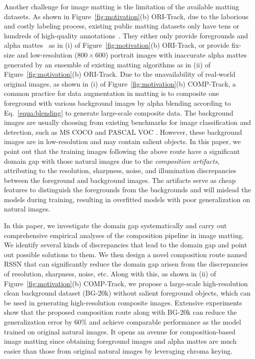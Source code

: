 \documentclass[twocolumn]{svjour3}
\begin{document}
Another challenge for image matting is the limitation of the available matting datasets. As shown in Figure~\ref{fig:motivation}(b) ORI-Track, due to the laborious and costly labeling process, existing public matting datasets only have tens or hundreds of high-quality annotations~\citep{rhemann2009perceptually,shen2016deep,xu2017deep,zhang2019late,Qiao_2020_CVPR}. They either only provide foregrounds and alpha mattes~\citep{xu2017deep,Qiao_2020_CVPR} as in (i) of Figure~\ref{fig:motivation}(b) ORI-Track, or provide fix-size and low-resolution ($800\times600$) portrait images with inaccurate alpha mattes~\citep{shen2016deep} generated by an ensemble of existing matting algorithms as in (ii) of Figure~\ref{fig:motivation}(b) ORI-Track. Due to the unavailability of real-world original images, as shown in (i) of Figure~\ref{fig:motivation}(b) COMP-Track, a common practice for data augmentation in matting is to composite one foreground with various background images by alpha blending according to Eq.~\eqref{equa:blending} to generate large-scale composite data. The background images are usually choosing from existing benchmarks for image classification and detection, such as MS COCO \citep{lin2014microsoft} and PASCAL VOC \citep{everingham2010pascal}. However, these background images are in low-resolution and may contain salient objects. In this paper, we point out that the training images following the above route have a significant domain gap with those natural images due to the \emph{composition artifacts}, attributing to the resolution, sharpness, noise, and illumination discrepancies between the foreground and background images. The artifacts serve as cheap features to distinguish the foregrounds from the backgrounds and will mislead the models during training, resulting in overfitted models with poor generalization on natural images.


In this paper, we investigate the domain gap systematically and carry out comprehensive empirical analyses of the composition pipeline in image matting. We identify several kinds of discrepancies that lead to the domain gap and point out possible solutions to them. We then design a novel composition route named RSSN that can significantly reduce the domain gap arisen from the discrepancies of resolution, sharpness, noise, etc. Along with this, as shown in (ii) of Figure~\ref{fig:motivation}(b) COMP-Track, we propose a large-scale high-resolution clean background dataset (BG-20k) without salient foreground objects, which can be used in generating high-resolution composite images. Extensive experiments show that the proposed composition route along with BG-20k can reduce the generalization error by 60\% and achieve comparable performance as the model trained on original natural images. It opens an avenue for composition-based image matting since obtaining foreground images and alpha mattes are much easier than those from original natural images by leveraging chroma keying.
\end{document}
